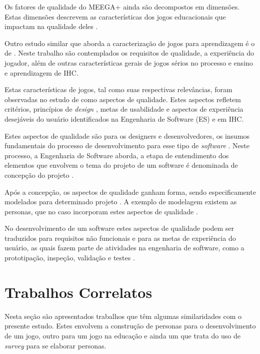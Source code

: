 Os fatores de qualidade do MEEGA+ ainda são decompostos em dimensões. Estas dimensões descrevem as características dos jogos educacionais que impactam na qualidade deles \cite{Petri_Wangenheim_2019}.

Outro estudo similar que aborda a caracterização de jogos para aprendizagem é o de . Neste trabalho são contemplados os requisitos de qualidade, a experiência do jogador, além de outras características gerais de jogos sérios no processo e ensino e aprendizagem de IHC. 

Estas características de jogos, tal como suas respectivas relevâncias, foram observadas no estudo de  como aspectos de qualidade. Estes aspectos refletem critérios, princípios de \textit{design} \cite{nielsen1994, ISO9126-1, BarbosaEtAl2021}, metas de usabilidade e aspectos de experiência desejáveis do usuário \cite{Preece_Rogers_Sharp_2005} identificados na Engenharia de Software (ES) e em IHC.

Estes aspectos de qualidade são para os designers e desenvolvedores, os insumos fundamentais do processo de desenvolvimento para esse tipo de \textit{software} \cite{silva_sales_mendes2021}. Neste processo, a Engenharia de Software aborda, a etapa de entendimento dos elementos que envolvem o tema do projeto de um software é denominada de concepção do projeto \cite[p. 127]{Pressman_2000}.

Após a concepção, os aspectos de qualidade ganham forma, sendo especificamente modelados para determinado projeto \cite[p. 151]{BarbosaEtAl2021}. A exemplo de modelagem existem as personas, que no caso incorporam estes aspectos de qualidade \cite[p. 154]{BarbosaEtAl2021}.

No desenvolvimento de um software estes aspectos de qualidade podem ser traduzidos para requisitos não funcionais \cite{swebok2014} e para as metas de experiência do usuário, as quais fazem parte de atividades na engenharia de software, como a prototipação, inspeção, validação e testes \cite{Pressman_2000}.

\section{Trabalhos Correlatos}
\label{sec:trab_cor}

Nesta seção são apresentados trabalhos que têm algumas similaridades com o presente estudo. Estes envolvem a construção de personas para o desenvolvimento de um jogo, outro para um jogo na educação e ainda um que trata do uso de \textit{survey} para se elaborar personas.

